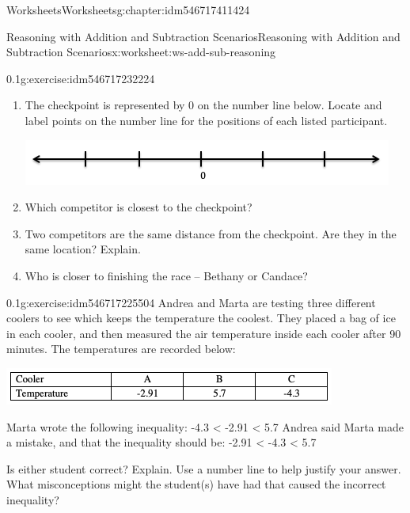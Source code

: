\documentclass[twoside,11pt,]{book}
\begin{document}
\begin{chapterptx}{Worksheets}{}{Worksheets}{}{}{g:chapter:idm546717411424}
\begin{worksheet-section-numberless}{Reasoning with Addition and Subtraction Scenarios}{}{Reasoning with Addition and Subtraction Scenarios}{}{}{x:worksheet:ws-add-sub-reasoning}
\begin{divisionexercise}{5}{}{0.1}{g:exercise:idm546717232224}
\begin{sidebyside}{1}{0.05}{0.05}{0}
\begin{sbspanel}{0.9}
\end{sbspanel}%
\end{sidebyside}%
%
\begin{enumerate}[label=(\alph*)]
\item{}The checkpoint is represented by 0 on the number line below.  Locate and label points on the number line for the positions of each listed participant. \begin{sidebyside}{1}{0.05}{0.05}{0}%
\begin{sbspanel}{0.9}%
\includegraphics[width=1\linewidth]{images/blank-number-line.png}
\end{sbspanel}%
\end{sidebyside}%
%
\item{}Which competitor is closest to the checkpoint?%
\item{}Two competitors are the same distance from the checkpoint.  Are they in the same location?  Explain.%
\item{}Who is closer to finishing the race – Bethany or Candace?%
\end{enumerate}
\end{divisionexercise}%
\clearpage
\begin{divisionexercise}{6}{}{0.1}{g:exercise:idm546717225504}%
Andrea and Marta are testing three different coolers to see which keeps the temperature the coolest.  They placed a bag of ice in each cooler, and then measured the air temperature inside each cooler after 90 minutes.  The temperatures are recorded below:%
\begin{image}{0}{1}{0}%
\includegraphics[width=1\linewidth]{images/reasoning-table-cooler.png}
\end{image}%
Marta wrote the following inequality: -4.3 \textless{}  -2.91 \textless{} 5.7 Andrea said Marta made a mistake, and that the inequality should be: -2.91 \textless{} -4.3 \textless{} 5.7%
\par
Is either student correct?  Explain.  Use a number line to help justify your answer.  What misconceptions might the student(s) have had that caused the incorrect inequality?%
\end{divisionexercise}%

\end{worksheet-section-numberless}
\end{chapterptx}
\end{document}
